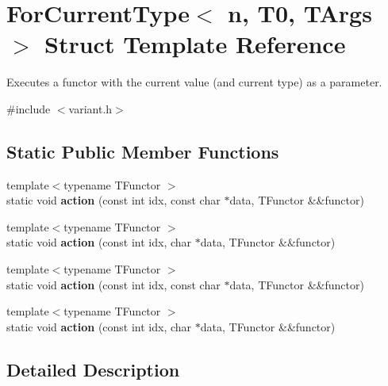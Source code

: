 \hypertarget{structForCurrentType}{}\section{For\+Current\+Type$<$ n, T0, T\+Args $>$ Struct Template Reference}
\label{structForCurrentType}


Executes a functor with the current value (and current type) as a parameter.  




{\ttfamily \#include $<$variant.\+h$>$}

\subsection*{Static Public Member Functions}
\begin{DoxyCompactItemize}
\item 
\hypertarget{structForCurrentType_ad6adf27f49de5abd55e84ea9ad5186f6}{}\label{structForCurrentType_ad6adf27f49de5abd55e84ea9ad5186f6} 
{\footnotesize template$<$typename T\+Functor $>$ }\\static void {\bfseries action} (const int idx, const char $\ast$data, T\+Functor \&\&functor)
\item 
\hypertarget{structForCurrentType_af3b60c9ad8e184b3609f08b2f77bd503}{}\label{structForCurrentType_af3b60c9ad8e184b3609f08b2f77bd503} 
{\footnotesize template$<$typename T\+Functor $>$ }\\static void {\bfseries action} (const int idx, char $\ast$data, T\+Functor \&\&functor)
\item 
\hypertarget{structForCurrentType_ad6adf27f49de5abd55e84ea9ad5186f6}{}\label{structForCurrentType_ad6adf27f49de5abd55e84ea9ad5186f6} 
{\footnotesize template$<$typename T\+Functor $>$ }\\static void {\bfseries action} (const int idx, const char $\ast$data, T\+Functor \&\&functor)
\item 
\hypertarget{structForCurrentType_af3b60c9ad8e184b3609f08b2f77bd503}{}\label{structForCurrentType_af3b60c9ad8e184b3609f08b2f77bd503} 
{\footnotesize template$<$typename T\+Functor $>$ }\\static void {\bfseries action} (const int idx, char $\ast$data, T\+Functor \&\&functor)
\end{DoxyCompactItemize}


\subsection{Detailed Description}
